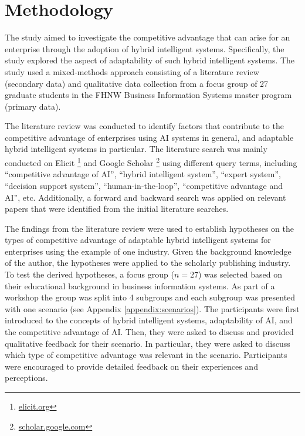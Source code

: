 \section{Methodology}
\label{sec:methods}

The study aimed to investigate the competitive advantage that can arise for an enterprise
through the adoption of hybrid intelligent systems. Specifically, the study explored the aspect of adaptability
of such hybrid intelligent systems. The study used a mixed-methods approach consisting of a literature
review (secondary data) and qualitative data collection from a focus group of 27 graduate students in the
FHNW Business Information Systems master program (primary data).

The literature review was conducted to identify factors that contribute to the competitive advantage
of enterprises using AI systems in general, and adaptable hybrid intelligent systems in particular.
The literature search was mainly conducted on Elicit \footnote{\href{https://elicit.org/}{elicit.org}}
and Google Scholar \footnote{\href{https://scholar.google.com/}{scholar.google.com}} using different
query terms, including ``competitive advantage of AI'', ``hybrid intelligent system'',
``expert system'', ``decision support system'', ``human-in-the-loop'', ``competitive advantage and AI'',
etc. Additionally, a forward and backward search was applied on relevant papers that were identified
from the initial literature searches.

The findings from the literature review were used to establish hypotheses on the types of competitive
advantage of adaptable hybrid intelligent systems for enterprises using the example of one industry. Given the
background knowledge of the author, the hypotheses were applied to the scholarly publishing industry.
To test the derived hypotheses, a focus group ($n = 27$) was selected based on their educational
background in business information systems. As part of a workshop the group was split into 4 subgroups and 
each subgroup was presented with one scenario (see Appendix \ref{appendix:scenarios}). The participants were
first introduced to the concepts of hybrid intelligent systems, adaptability of AI, and the competitive advantage
of AI. Then, they were asked to discuss and provided qualitative feedback for their scenario. In particular, 
they were asked to discuss which type of competitive advantage was relevant in the scenario. Participants
were encouraged to provide detailed feedback on their experiences and perceptions.

